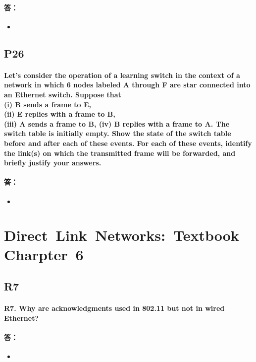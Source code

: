 \documentclass[a4paper]{ctexart}
\begin{document}
\paragraph*{答：} 
\begin{itemize}
    \item 
\end{itemize}

\subsection*{P26}
\paragraph*{Let’s consider the operation of a learning switch in the context of a network in which 6 nodes labeled A through F are star connected into an Ethernet switch. Suppose that\\
(i) B sends a frame to E,\\
(ii) E replies with a frame to B,\\
(iii) A sends a frame to B, (iv) B replies with a frame to A. The switch table is initially empty. Show the state of the switch table before and after each of these events. For each of these events, identify the link(s) on which the transmitted frame will be forwarded, and briefly justify your answers.\\}
\paragraph*{答：} 
\begin{itemize}
    \item 
\end{itemize}

\section*{Direct\ Link\ Networks:\ Textbook\ Charpter\ 6}
\subsection*{R7}
\paragraph*{R7. Why are acknowledgments used in 802.11 but not in wired Ethernet?\\}
\paragraph*{答：} 
\begin{itemize}
    \item 
\end{itemize}
\end{document}

